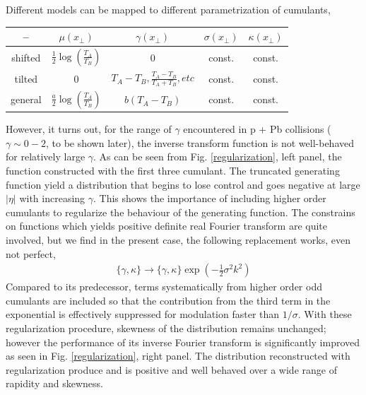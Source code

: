 \documentclass[10pt,a4paper, twocolumn]{article}
\begin{document}
	Different models can be mapped to different parametrization of cumulants,
	
	\begin{strip}
	\begin{center}
	\begin{tabular}{c|c|c|c|c}
	\hline
	--	&	$\mu(x_\perp)$ & $\gamma(x_\perp)$ & $\sigma(x_\perp)$ & $\kappa(x_\perp)$	\\
	\hline
	shifted & $\frac{1}{2}\log\left(\frac{T_A}{T_B}\right)$ & $0$	& const. & const.\\
	tilted & $0$ & $T_A - T_B, \frac{T_A-T_B}{T_A+T_B}, etc$	& const.& const.\\
	general & $\frac{a}{2}\log\left(\frac{T_A}{T_B}\right)$  & $b(T_A - T_B)$ & const.& const. \\
	\hline
	\end{tabular}
	\end{center}
	\end{strip}
	However, it turns out, for the range of $\gamma$ encountered in p + Pb collisions ($\gamma \sim 0-2$, to be shown later), the inverse transform function is not well-behaved for relatively large $\gamma$. 
	As can be seen from Fig. \ref{regularization}, left panel, the function constructed with the first three cumulant. 
	The truncated generating function yield a distribution that begins to lose control and goes negative at large $|\eta|$ with increasing $\gamma$. 
	This shows the importance of including higher order cumulants to regularize the behaviour of the generating function. 
	The constrains on functions which yields positive definite real Fourier transform are quite involved, but we find in the present case, the following replacement works, even not perfect,
	\begin{eqnarray}
		\{\gamma, \kappa\} \rightarrow \{\gamma, \kappa\} \exp\left(-\frac{1}{2}\sigma^2k^2\right) 
	\end{eqnarray}
	Compared to its predecessor, terms systematically from higher order odd cumulants are included so that the contribution from the third term in the exponential is effectively suppressed for modulation faster than $1/\sigma$. 
	With these regularization procedure, skewness of the distribution remains unchanged; however the performance of its inverse Fourier transform is significantly improved as seen in Fig. \ref{regularization}, right panel. 
	The distribution reconstructed with regularization produce and is positive and well behaved over a wide range of rapidity and skewness.
\end{document}
